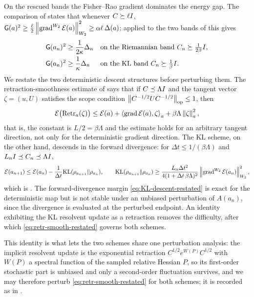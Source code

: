 On the rescued bands the Fisher--Rao gradient dominates the energy gap. The comparison of
 states that whenever $C\succeq\ell I$,
$\mathsf{G}(a)^2\geq\tfrac\ell2\left\lVert \operatorname{grad}^{W_2}\mathcal{E}(a)\right\rVert_{W_2}^2\geq\alpha\ell\,\Delta(a)$; applied
to the two bands of  this gives
\begin{equation}
\label{eq:PL-bands}
\begin{aligned}
    \mathsf{G}(a_n)^2&\geq\frac1{2\kappa}\Delta_n
    &&\text{on the Riemannian band }C_n\succeq\tfrac1{2\beta}I,\\
    \mathsf{G}(a_n)^2&\geq\frac1\kappa\Delta_n
    &&\text{on the KL band }C_n\succeq\tfrac1\beta I .
\end{aligned}
\end{equation}
We restate the two deterministic descent structures before perturbing them. The
retraction-smoothness estimate of
 says that if $C\preceq\Lambda I$ and the tangent vector $\zeta=(u,U)$ satisfies the
scope condition $\left\lVert C^{-1/2}UC^{-1/2}\right\rVert_{\mathrm{op}}\leq1$, then
\begin{equation}
\label{eq:retr-smooth-restated}
    \mathcal{E}\bigl(\operatorname{Retr}_a(\zeta)\bigr)\leq\mathcal{E}(a)+\left\langle \operatorname{grad}\mathcal{E}(a),\zeta\right\rangle_a+\beta\Lambda\left\lVert \zeta\right\rVert_a^2 ,
\end{equation}
that is, the constant is $L/2=\beta\Lambda$ and the estimate holds for an arbitrary tangent
direction, not only for the deterministic gradient direction. The KL scheme, on the other hand,
descends in the forward divergence: for $\Delta t\leq1/(\beta\Lambda)$ and $L_nI\preceq C_n\preceq\Lambda I$,
\begin{equation}
\label{eq:KL-descent-restated}
    \mathcal{E}(a_{n+1})\leq\mathcal{E}(a_n)-\frac1{\Delta t}\mathrm{KL}(\rho_{a_{n+1}}\|\rho_{a_n}),
    \qquad
    \mathrm{KL}(\rho_{a_{n+1}}\|\rho_{a_n})\geq\frac{L_n\Delta t^2}{4(1+\Delta t\,\beta\Lambda)^2}\left\lVert \operatorname{grad}^{W_2}\mathcal{E}(a_n)\right\rVert_{W_2}^2 ,
\end{equation}
which is . The forward-divergence margin \eqref{eq:KL-descent-restated} is
exact for the deterministic map but is not stable under an unbiased perturbation of $A(a_n)$, since the
divergence is evaluated at the perturbed endpoint. An identity exhibiting the KL resolvent update as
a retraction removes the difficulty, after which \eqref{eq:retr-smooth-restated}
governs both schemes.

This identity is what lets the two schemes share one perturbation analysis: the
implicit resolvent update is the exponential retraction $C^{1/2}e^{W(P)}C^{1/2}$ with $W(P)$ a spectral
function of the sampled relative Hessian $P$, so its first-order stochastic part is unbiased and only a
second-order fluctuation survives, and we may therefore perturb \eqref{eq:retr-smooth-restated} for
both schemes; it is recorded as  in .

